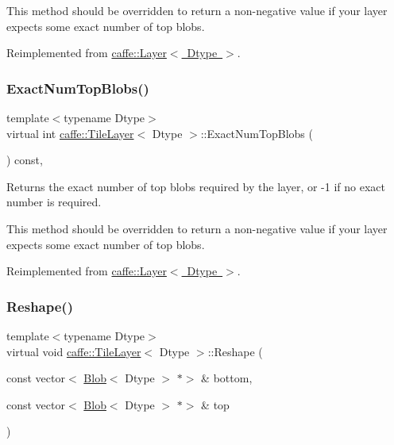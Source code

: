 This method should be overridden to return a non-\/negative value if your layer expects some exact number of top blobs. 

Reimplemented from \mbox{\hyperlink{classcaffe_1_1_layer_a64e2ca72c719e4b2f1f9216ccfb0d37f}{caffe\+::\+Layer$<$ Dtype $>$}}.

\mbox{\label{classcaffe_1_1_tile_layer_a1040cc3b4fb028d54f67a685513d745b}} 
\subsubsection{\texorpdfstring{Exact\+Num\+Top\+Blobs()}{ExactNumTopBlobs()}\hspace{0.1cm}{\footnotesize\ttfamily [2/2]}}
{\footnotesize\ttfamily template$<$typename Dtype$>$ \\
virtual int \mbox{\hyperlink{classcaffe_1_1_tile_layer}{caffe\+::\+Tile\+Layer}}$<$ Dtype $>$\+::Exact\+Num\+Top\+Blobs (\begin{DoxyParamCaption}{ }\end{DoxyParamCaption}) const\hspace{0.3cm}{\ttfamily [inline]}, {\ttfamily [virtual]}}



Returns the exact number of top blobs required by the layer, or -\/1 if no exact number is required. 

This method should be overridden to return a non-\/negative value if your layer expects some exact number of top blobs. 

Reimplemented from \mbox{\hyperlink{classcaffe_1_1_layer_a64e2ca72c719e4b2f1f9216ccfb0d37f}{caffe\+::\+Layer$<$ Dtype $>$}}.

\mbox{\label{classcaffe_1_1_tile_layer_a1fe845a1597dbc119e922ee92032632b}} 
\subsubsection{\texorpdfstring{Reshape()}{Reshape()}\hspace{0.1cm}{\footnotesize\ttfamily [1/2]}}
{\footnotesize\ttfamily template$<$typename Dtype$>$ \\
virtual void \mbox{\hyperlink{classcaffe_1_1_tile_layer}{caffe\+::\+Tile\+Layer}}$<$ Dtype $>$\+::Reshape (\begin{DoxyParamCaption}\item[{const vector$<$ \mbox{\hyperlink{classcaffe_1_1_blob}{Blob}}$<$ Dtype $>$ $\ast$$>$ \&}]{bottom,  }\item[{const vector$<$ \mbox{\hyperlink{classcaffe_1_1_blob}{Blob}}$<$ Dtype $>$ $\ast$$>$ \&}]{top }\end{DoxyParamCaption})\hspace{0.3cm}{\ttfamily [virtual]}}



